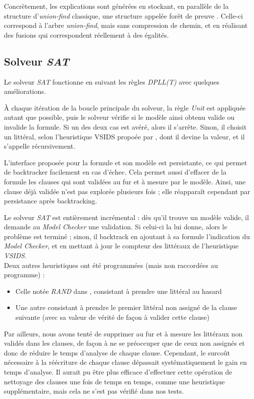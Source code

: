 \documentclass[a4paper, 10pt, french]{article}
\newcommand{\foreign}[1]{\emph{#1}}
\begin{document}
Concrètement, les explications sont générées en stockant, en parallèle de la 
structure d'\foreign{union-find} classique, une structure appelée \og forêt de 
preuve \fg. Celle-ci correspond à l'arbre \foreign{union-find}, mais sans 
compression de chemin, et en réalisant des fusions qui correspondent réellement 
à des égalités.


\subsection {Solveur \foreign{SAT}}

Le solveur \foreign{SAT} fonctionne en suivant les règles \foreign{DPLL(T)} avec quelques améliorations.

À chaque itération de la boucle principale du solveur, la règle \foreign{Unit} est appliquée autant que possible, puis le solveur vérifie si le modèle ainsi obtenu valide ou invalide la formule. Si un des deux cas est avéré, alors il s'arrête. Sinon, il choisit un littéral, selon l'heuristique VSIDS propoée par \cite{Chaff}, dont il devine la valeur, et il s'appelle récursivement.

L'interface proposée pour la formule et son modèle est persistante, ce qui permet de backtracker facilement en cas d'échec. Cela permet aussi d'effacer de la formule les clauses qui sont validées au fur et à mesure par le modèle. Ainsi, une clause déjà validée n'est pas explorée plusieurs fois ; elle réapparaît cependant par persistance après backtracking.

Le solveur \foreign{SAT} est entièrement incrémental : dès qu'il trouve un modèle valide, il demande au \foreign{Model Checker} une validation. Si celui-ci la lui donne, alors le problème est terminé ; sinon, il backtrack en ajoutant à sa formule l'indication du \foreign{Model Checker}, et en mettant à jour le compteur des littéraux de l'heuristique \foreign{VSIDS}.\\

Deux autres heuristiques ont été programmées (mais non raccordées au programme) : \begin{itemize}
	\item Celle notée \foreign{RAND} dans \cite{Chaff}, consistant à prendre une littéral au hasard
	\item Une autre consistant à prendre le premier littéral non assigné de la clause suivante (avec sa valeur de vérité de façon à valider cette clause)
\end{itemize}

Par ailleurs, nous avons tenté de supprimer au fur et à mesure les littéraux non validés dans les clauses, de façon à ne se préoccuper que de ceux non assignés et donc de réduire le temps d'analyse de chaque clause. Cependant, le surcoût nécessaire à la réécriture de chaque clause dépassait systématiquement le gain en temps d'analyse. Il aurait pu être plus efficace d'effectuer cette opération de nettoyage des clauses une fois de temps en temps, comme une heuristique supplémentaire, mais cela ne s'est pas vérifié dans nos tests.
\end{document}
